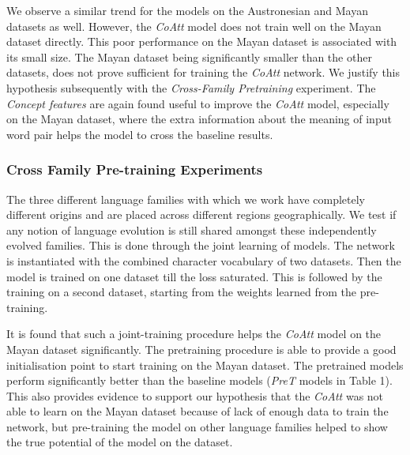 \documentclass[11pt,letterpaper]{article}
\begin{document}
We observe a similar trend for the models on the Austronesian and Mayan datasets as well. However, the \textit{CoAtt} model does not train well on the Mayan dataset directly. This poor performance on the Mayan dataset is associated with its small size. The Mayan dataset being significantly smaller than the other datasets, does not prove sufficient for training the \textit{CoAtt} network. We justify this hypothesis subsequently with the \textit{Cross-Family Pretraining} experiment. The \textit{Concept features} are again found useful to improve the \textit{CoAtt} model, especially on the Mayan dataset, where the extra information about the meaning of input word pair helps the model to cross the baseline results. 

\subsubsection*{Cross Family Pre-training Experiments}

The three different language families with which we work have completely different origins and are placed across different regions geographically. We test if any notion of language evolution is still shared amongst these independently evolved families. This is done through the joint learning of models. The network is instantiated with the combined character vocabulary of two datasets. Then the model is trained on one dataset till the loss saturated. This is followed by the training on a second dataset, starting from the weights learned from the pre-training. 

It is found that such a joint-training procedure helps the \textit{CoAtt} model on the Mayan dataset significantly. The pretraining procedure is able to provide a good initialisation point to start training on the Mayan dataset. The pretrained models perform significantly better than the baseline models (\textit{PreT} models in Table 1). This also provides evidence to support our hypothesis that the \textit{CoAtt} was not able to learn on the Mayan dataset because of lack of enough data to train the network, but pre-training the model on other language families helped to show the true potential of the model on the dataset.


\end{document}
